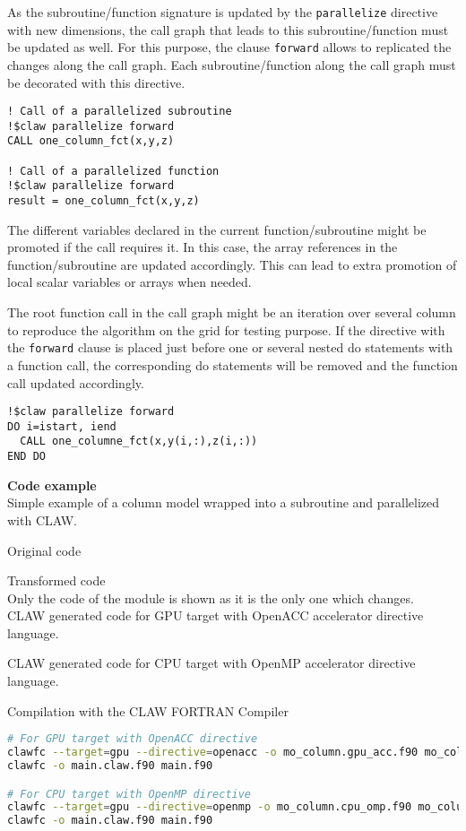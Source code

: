 As the subroutine/function signature is updated by the \lstinline!parallelize!
directive with new dimensions, the call graph that leads to this
subroutine/function must be updated as well. For this purpose, the clause
\lstinline!forward! allows to replicated the changes along the call graph.
Each subroutine/function along the call graph must be decorated with this
directive.

\begin{lstlisting}
! Call of a parallelized subroutine
!$claw parallelize forward
CALL one_column_fct(x,y,z)

! Call of a parallelized function
!$claw parallelize forward
result = one_column_fct(x,y,z)
\end{lstlisting}

The different variables declared in the current function/subroutine might be
promoted if the call requires it. In this case, the array references in
the function/subroutine are updated accordingly. This can lead to extra
promotion of local scalar variables or arrays when needed.

The root function call in the call graph might be an iteration over several
column to reproduce the algorithm on the grid for testing purpose. If the
directive with the \lstinline!forward! clause is placed just before one or
several nested do statements with a function call, the corresponding do
statements will be removed and the function call updated accordingly.

\begin{lstlisting}
!$claw parallelize forward
DO i=istart, iend
  CALL one_columne_fct(x,y(i,:),z(i,:))
END DO
\end{lstlisting}


\textbf{Code example}\\
\label{parallelize1}
Simple example of a column model wrapped into a subroutine and parallelized with
CLAW.

Original code



Transformed code\\
Only the code of the module is shown as it is the only one which changes.\\

CLAW generated code for GPU target with OpenACC accelerator directive language.


CLAW generated code for CPU target with OpenMP accelerator directive language.


Compilation with the CLAW FORTRAN Compiler
\begin{lstlisting}[language=bash]
# For GPU target with OpenACC directive
clawfc --target=gpu --directive=openacc -o mo_column.gpu_acc.f90 mo_column.f90
clawfc -o main.claw.f90 main.f90

# For CPU target with OpenMP directive
clawfc --target=gpu --directive=openmp -o mo_column.cpu_omp.f90 mo_column.f90
clawfc -o main.claw.f90 main.f90
\end{lstlisting}
